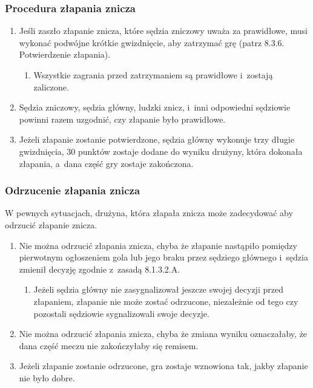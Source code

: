 \documentclass[12pt]{article}
\begin{document}
\subsubsection{Procedura złapania znicza}

\begin{enumerate}
	\item
	      Jeśli zaszło złapanie znicza, które sędzia zniczowy uważa za
	      prawidłowe, musi wykonać podwójne krótkie gwizdnięcie, aby zatrzymać
	      grę (patrz 8.3.6. Potwierdzenie złapania).

	      \begin{enumerate}
		      \item
		            Wszystkie zagrania przed zatrzymaniem są prawidłowe i~zostają
		            zaliczone.
	      \end{enumerate}
	\item
	      Sędzia zniczowy, sędzia główny, ludzki znicz, i~inni odpowiedni
	      sędziowie powinni razem uzgodnić, czy złapanie było prawidłowe.
	\item
	      Jeżeli złapanie zostanie potwierdzone, sędzia główny wykonuje trzy
	      długie gwizdnięcia, 30 punktów zostaje dodane do wyniku drużyny, która
	      dokonała złapania, a~dana część gry zostaje zakończona.
\end{enumerate}

\subsubsection{Odrzucenie złapania znicza}

W pewnych sytuacjach, drużyna, która złapała znicza może zadecydować aby
odrzucić złapanie znicza.

\begin{enumerate}
	\item
	      Nie można odrzucić złapania znicza, chyba że złapanie nastąpiło
	      pomiędzy pierwotnym ogłoszeniem gola lub jego braku przez sędziego
	      głównego i~sędzia zmienił decyzję zgodnie z~zasadą 8.1.3.2.A.

	      \begin{enumerate}
		      \item
		            Jeżeli sędzia główny nie zasygnalizował jeszcze swojej decyzji przed
		            złapaniem, złapanie nie może zostać odrzucone, niezależnie od tego
		            czy pozostali sędziowie sygnalizowali swoje decyzje.
	      \end{enumerate}
	\item
	      Nie można odrzucić złapania znicza, chyba że zmiana wyniku
	      oznaczałaby, że dana część meczu nie zakończyłaby się remisem.
	\item
	      Jeżeli złapanie zostanie odrzucone, gra zostaje wznowiona tak, jakby
	      złapanie nie było dobre.
\end{enumerate}
\end{document}
